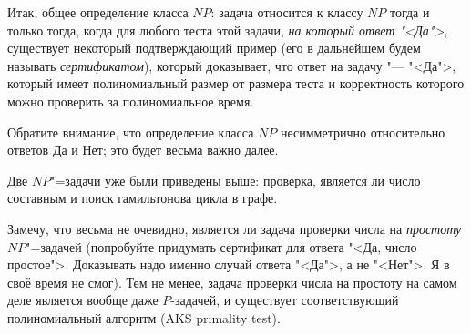\documentclass[a4paper,10pt]{problems}
\begin{document}
Итак, общее определение класса $NP$: задача относится к классу $NP$ тогда и 
только тогда, когда для любого теста этой задачи, \textit{на который ответ 
"<Да">}, существует некоторый подтверждающий пример (его в дальнейшем будем 
называть \textit{сертификатом}), который доказывает, что ответ на задачу "--- 
"<Да">, который имеет полиномиальный размер от размера теста и корректность 
которого можно проверить за полиномиальное время.


Обратите внимание, что определение класса $NP$ несимметрично относительно 
ответов Да и Нет; это будет весьма важно далее.

 Две $NP$"=задачи уже были приведены выше: 
проверка, является ли число составным и поиск гамильтонова цикла в графе. 

Замечу, что весьма не очевидно, является ли задача проверки числа на 
\textit{простоту} $NP$"=задачей (попробуйте придумать сертификат для ответа 
"<Да, число простое">. Доказывать надо именно случай ответа "<Да">, а не 
"<Нет">. Я в своё время не смог). 
Тем не менее, задача проверки числа на простоту на самом деле 
является вообще даже $P$-задачей,
и существует соответствующий полиномиальный алгоритм (AKS primality test).
\end{document}
